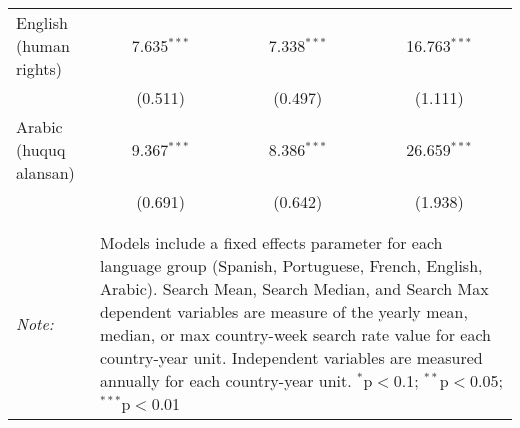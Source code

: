 \begin{table}[!htbp]
\begin{tabular}{@{\extracolsep{5pt}}lccc}
  English (human rights) & 7.635$^{***}$ & 7.338$^{***}$ & 16.763$^{***}$ \\ 
  & (0.511) & (0.497) & (1.111) \\ 
  Arabic (huquq alansan) & 9.367$^{***}$ & 8.386$^{***}$ & 26.659$^{***}$ \\ 
  & (0.691) & (0.642) & (1.938) \\ 
 \hline \\[-1.8ex] 
\hline 
\hline \\[-1.8ex] 
\textit{Note:}  & \multicolumn{3}{l}{\parbox[t]{8cm}{Models include a fixed effects parameter for each language group (Spanish, Portuguese, French, English, Arabic). Search Mean, Search Median, and Search Max dependent variables are measure of the yearly mean, median, or max country-week search rate value for each country-year unit. Independent variables are measured annually for each country-year unit. $^{*}$p$<$0.1; $^{**}$p$<$0.05; $^{***}$p$<$0.01}} \\ 
\end{tabular} 
\end{table} 
